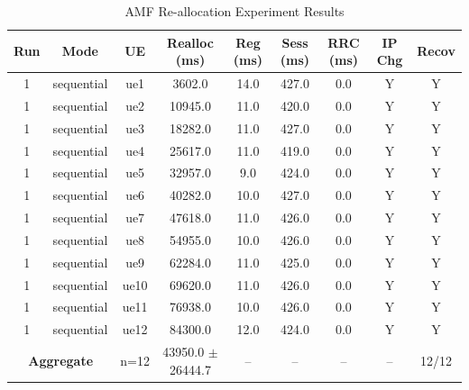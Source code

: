 \begin{table}[ht]
\centering
\begin{tabular}{|c|c|c|c|c|c|c|c|c|}
\hline
Run & Mode & UE & Realloc (ms) & Reg (ms) & Sess (ms) & RRC (ms) & IP Chg & Recov \\
\hline
1 & sequential & ue1 & 3602.0 & 14.0 & 427.0 & 0.0 & Y & Y \\
1 & sequential & ue2 & 10945.0 & 11.0 & 420.0 & 0.0 & Y & Y \\
1 & sequential & ue3 & 18282.0 & 11.0 & 427.0 & 0.0 & Y & Y \\
1 & sequential & ue4 & 25617.0 & 11.0 & 419.0 & 0.0 & Y & Y \\
1 & sequential & ue5 & 32957.0 & 9.0 & 424.0 & 0.0 & Y & Y \\
1 & sequential & ue6 & 40282.0 & 10.0 & 427.0 & 0.0 & Y & Y \\
1 & sequential & ue7 & 47618.0 & 11.0 & 426.0 & 0.0 & Y & Y \\
1 & sequential & ue8 & 54955.0 & 10.0 & 426.0 & 0.0 & Y & Y \\
1 & sequential & ue9 & 62284.0 & 11.0 & 425.0 & 0.0 & Y & Y \\
1 & sequential & ue10 & 69620.0 & 11.0 & 426.0 & 0.0 & Y & Y \\
1 & sequential & ue11 & 76938.0 & 10.0 & 426.0 & 0.0 & Y & Y \\
1 & sequential & ue12 & 84300.0 & 12.0 & 424.0 & 0.0 & Y & Y \\
\multicolumn{2}{|c|}{\textbf{Aggregate}} & n=12 & 43950.0 $\pm$ 26444.7 & -- & -- & -- & -- & 12/12 \\
\hline
\end{tabular}
\caption{AMF Re-allocation Experiment Results}
\label{tab:amf_realloc}
\end{table}
